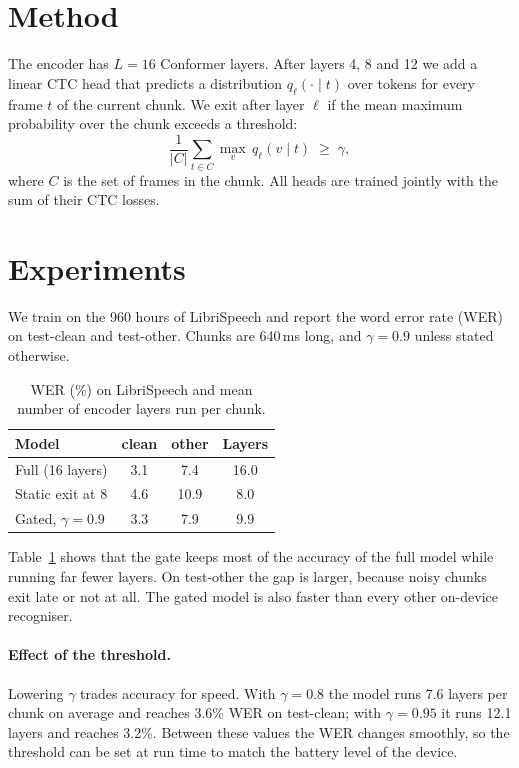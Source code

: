 \documentclass[10pt,twocolumn]{article}
\begin{document}
\section{Method}

The encoder has $L = 16$ Conformer layers.
After layers 4, 8 and 12 we add a linear CTC head that predicts a distribution $q_\ell(\cdot \mid t)$ over tokens for every frame $t$ of the current chunk.
We exit after layer $\ell$ if the mean maximum probability over the chunk exceeds a threshold:
\begin{equation}
\frac{1}{|C|} \sum_{t \in C} \max_{v} \, q_\ell(v \mid t) \;\ge\; \gamma,
\label{eq:gate}
\end{equation}
where $C$ is the set of frames in the chunk.
All heads are trained jointly with the sum of their CTC losses.

\section{Experiments}

We train on the 960 hours of LibriSpeech \citep{panayotov2015librispeech} and report the word error rate (WER) on test-clean and test-other.
Chunks are 640\,ms long, and $\gamma = 0.9$ unless stated otherwise.

\begin{table}[t]
\centering
\caption{WER (\%) on LibriSpeech and mean number of encoder layers run per chunk.}
\label{tab:wer}
\begin{tabular}{lccc}
\toprule
Model & clean & other & Layers \\
\midrule
Full (16 layers) & 3.1 & 7.4 & 16.0 \\
Static exit at 8 & 4.6 & 10.9 & 8.0 \\
Gated, $\gamma = 0.9$ & 3.3 & 7.9 & 9.9 \\
\bottomrule
\end{tabular}
\end{table}

Table~\ref{tab:wer} shows that the gate keeps most of the accuracy of the full model while running far fewer layers.
On test-other the gap is larger, because noisy chunks exit late or not at all.
The gated model is also faster than every other on-device recogniser.

\paragraph{Effect of the threshold.}
Lowering $\gamma$ trades accuracy for speed.
With $\gamma = 0.8$ the model runs 7.6 layers per chunk on average and reaches 3.6\% WER on test-clean; with $\gamma = 0.95$ it runs 12.1 layers and reaches 3.2\%.
Between these values the WER changes smoothly, so the threshold can be set at run time to match the battery level of the device.
\end{document}

